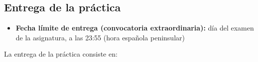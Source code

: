\subsection{Entrega de la práctica}

\begin{itemize}
\item \textbf{Fecha límite de entrega (convocatoria extraordinaria):} día del examen de la asignatura, a las 23:55 (hora española peninsular)

    

\end{itemize}

La entrega de la práctica consiste en:


